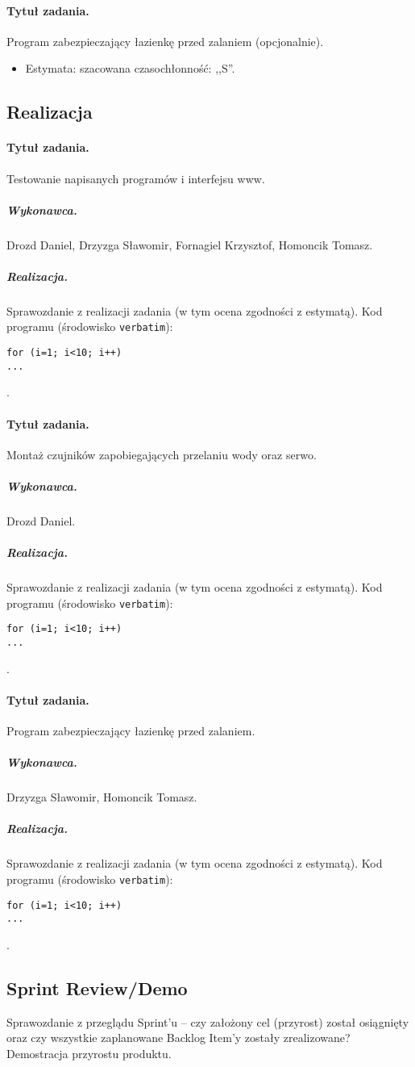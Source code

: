 \paragraph{Tytuł zadania.} Program zabezpieczający łazienkę przed zalaniem (opcjonalnie).
\begin{itemize}
	\item Estymata: szacowana czasochłonność: ,,S''.
\end{itemize}


\subsection{Realizacja}

\paragraph{Tytuł zadania.} Testowanie napisanych programów i interfejsu www.
\subparagraph{Wykonawca.} Drozd Daniel, Drzyzga Sławomir, Fornagiel Krzysztof, Homoncik Tomasz.
\subparagraph{Realizacja.} Sprawozdanie z realizacji zadania (w tym ocena zgodności z estymatą). Kod programu (środowisko \texttt{verbatim}): \begin{verbatim}
for (i=1; i<10; i++)
...
\end{verbatim}.

\paragraph{Tytuł zadania.} Montaż czujników zapobiegających przelaniu wody oraz serwo.
\subparagraph{Wykonawca.} Drozd Daniel.
\subparagraph{Realizacja.} Sprawozdanie z realizacji zadania (w tym ocena zgodności z estymatą). Kod programu (środowisko \texttt{verbatim}): \begin{verbatim}
for (i=1; i<10; i++)
...
\end{verbatim}.

\paragraph{Tytuł zadania.} Program zabezpieczający łazienkę przed zalaniem.
\subparagraph{Wykonawca.} Drzyzga Sławomir, Homoncik Tomasz.
\subparagraph{Realizacja.} Sprawozdanie z realizacji zadania (w tym ocena zgodności z estymatą). Kod programu (środowisko \texttt{verbatim}): \begin{verbatim}
for (i=1; i<10; i++)
...
\end{verbatim}.


\subsection{Sprint Review/Demo}
Sprawozdanie z przeglądu Sprint'u -- czy założony cel (przyrost) został osiągnięty oraz czy wszystkie zaplanowane Backlog Item'y zostały zrealizowane? Demostracja przyrostu produktu.
